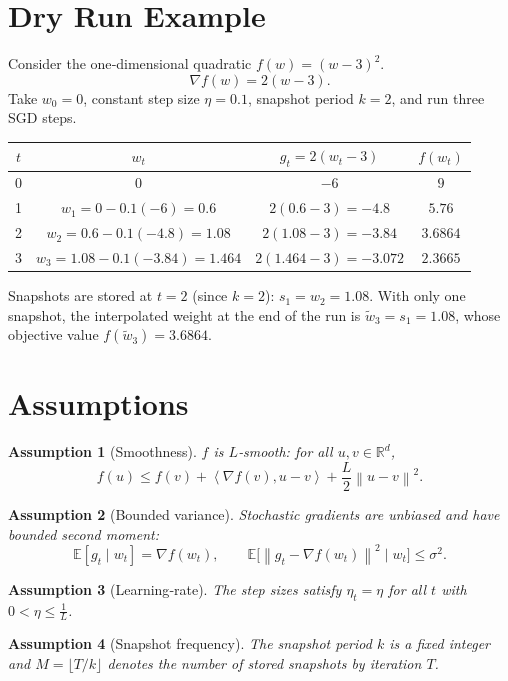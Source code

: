 \documentclass{article}
\newtheorem{assumption}{Assumption}
\newcommand{\E}{\mathbb{E}}
\newcommand{\norm}[1]{\left\|#1\right\|}
\newcommand{\ip}[2]{\left\langle #1,#2\right\rangle}
\begin{document}
\section*{Dry Run Example}
Consider the one‑dimensional quadratic $f(w)=(w-3)^2$.
\[
\nabla f(w)=2(w-3).
\]
Take $w_0=0$, constant step size $\eta=0.1$, snapshot period $k=2$, and run three SGD steps.

\begin{center}
\begin{tabular}{c|c|c|c}
$t$ & $w_t$ & $g_t=2(w_t-3)$ & $f(w_t)$\\ \hline
0 & $0$ & $-6$ & $9$\\
1 & $w_1=0-0.1(-6)=0.6$ & $2(0.6-3)=-4.8$ & $5.76$\\
2 & $w_2=0.6-0.1(-4.8)=1.08$ & $2(1.08-3)=-3.84$ & $3.6864$\\
3 & $w_3=1.08-0.1(-3.84)=1.464$ & $2(1.464-3)=-3.072$ & $2.3665$
\end{tabular}
\end{center}

Snapshots are stored at $t=2$ (since $k=2$): $s_1=w_2=1.08$.  
With only one snapshot, the interpolated weight at the end of the run is $\tilde w_3=s_1=1.08$, whose objective value $f(\tilde w_3)=3.6864$.

\section*{Assumptions}
\begin{assumption}[Smoothness]\label{ass:smooth}
$f$ is $L$‑smooth: for all $u,v\in\mathbb{R}^d$,
\[
f(u)\le f(v)+\ip{\nabla f(v)}{u-v}+\frac{L}{2}\norm{u-v}^2 .
\]
\end{assumption}
\begin{assumption}[Bounded variance]\label{ass:var}
Stochastic gradients are unbiased and have bounded second moment:
\[
\E[g_t\mid w_t]=\nabla f(w_t),\qquad 
\E\big[\norm{g_t-\nabla f(w_t)}^2\mid w_t\big]\le\sigma^2 .
\]
\end{assumption}
\begin{assumption}[Learning‑rate]\label{ass:lr}
The step sizes satisfy $\eta_t=\eta$ for all $t$ with $0<\eta\le \tfrac{1}{L}$.
\end{assumption}
\begin{assumption}[Snapshot frequency]\label{ass:k}
The snapshot period $k$ is a fixed integer and $M=\lfloor T/k\rfloor$ denotes the number of stored snapshots by iteration $T$.
\end{assumption}
\end{document}
